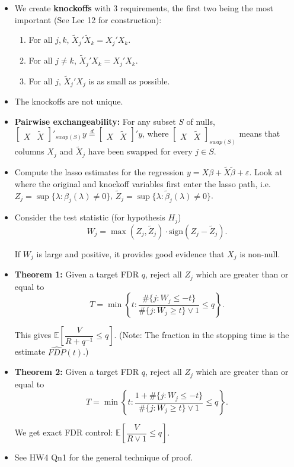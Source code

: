 \documentclass[twoside]{article}
\newcommand\bbE{\mathbb{E}}
\def\eps{\varepsilon}
\newcommand\lmb{\lambda}
\begin{document}
\begin{itemize}
\item We create \textbf{knockoffs} with 3 requirements, the first two being the most important (See Lec 12 for construction):
\begin{enumerate}
\item For all $j, k$, $\widetilde{X}_j' \widetilde{X}_k = X_j' X_k$.
\item For all $j \neq k$, $\widetilde{X}_j' X_k = X_j' X_k$.
\item For all $j$, $\widetilde{X}_j' X_j$ is as small as possible.
\end{enumerate}

\item The knockoffs are not unique.

\item \textbf{Pairwise exchangeability:} For any subset $S$ of nulls, $\begin{bmatrix} X & \widetilde{X} \end{bmatrix}'_{swap(S)}y \stackrel{d}{=} \begin{bmatrix} X & \widetilde{X} \end{bmatrix}' y$, where $\begin{bmatrix} X & \widetilde{X} \end{bmatrix}_{swap(S)}$ means that columns $X_j$ and $\widetilde{X}_j$ have been swapped for every $j \in S$.

\item Compute the lasso estimates for the regression $y = X\beta + \widetilde{X}\widetilde{\beta} + \eps$. Look at where the original and knockoff variables first enter the lasso path, i.e. $Z_j = \sup \{ \lmb: \beta_j(\lmb) \neq 0 \}$, $\widetilde{Z}_j = \sup \{ \lmb: \widetilde{\beta}_j(\lmb) \neq 0 \}$.

\item Consider the test statistic (for hypothesis $H_j$)
\[ W_j = \max(Z_j, \widetilde{Z}_j) \cdot \text{sign}(Z_j - \widetilde{Z}_j). \]

If $W_j$ is large and positive, it provides good evidence that $X_j$ is non-null.

\item \textbf{Theorem 1:} Given a target FDR $q$, reject all $Z_j$ which are greater than or equal to
\[ T = \min \left\{ t: \frac{\#\{j: W_j \leq -t\}}{\#\{j: W_j \geq t\} \vee 1} \leq q \right\}. \]

This gives $\bbE \left[\dfrac{V}{R + q^{-1}} \leq q \right]$. (Note: The fraction in the stopping time is the estimate $\widehat{FDP}(t)$.)

\item \textbf{Theorem 2:} Given a target FDR $q$, reject all $Z_j$ which are greater than or equal to
\[ T = \min \left\{ t: \frac{1 + \#\{j: W_j \leq -t\}}{\#\{j: W_j \geq t\} \vee 1} \leq q \right\}. \]

We get exact FDR control: $\bbE \left[\dfrac{V}{R \vee 1} \leq q \right]$.

\item See HW4 Qn1 for the general technique of proof.

\end{itemize}
\end{document}
